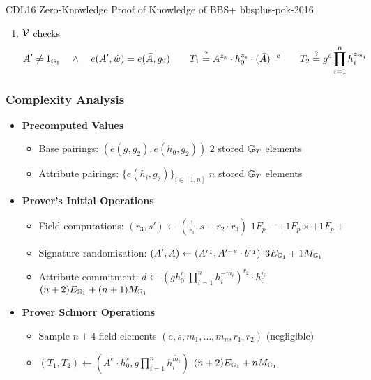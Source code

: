 {\begin{protocol}{CDL16 Zero-Knowledge Proof of Knowledge of BBS+  \cite{camenisch_anonymous_2016}}{bbsplus-pok-2016}
\begin{enumerate}
    \item $\mathcal{V}$ checks
        \[
            A' \neq 1_{\mathbb{G}_1} \quad \wedge \quad e(A',\hat{w}) = e(\Bar{A},g_2) \qquad T_1 \stackrel{?}{=} A^{z_e} \cdot h_0^{z_s} \cdot (\Bar{A})^{-c} \qquad T_2 \stackrel{?}{=} g^c\prod_{i=1}^n h_i^{z_{m_i}}
        \]
    \end{enumerate}
\end{protocol}

\newpage
\subsubsection{Complexity Analysis}

\begin{itemize}
    \item \textbf{Precomputed Values}
    \begin{itemize}
        \item Base pairings: $(e(g, g_2), e(h_0, g_2))$ \qquad $2$ stored $\mathbb{G}_T$ elements
        \item Attribute pairings: $\{e(h_i, g_2)\}_{i \in [1,n]}$ \qquad $n$ stored $\mathbb{G}_T$ elements
    \end{itemize}

    \item \textbf{Prover's Initial Operations}
    \begin{itemize}
        \item Field computations: $(r_3, s') \gets (\frac{1}{r_1}, s - r_2 \cdot r_3)$ \qquad $1F_p- + 1F_p\times + 1F_p+$
        \item Signature randomization: $(A', \Bar{A}) \gets (A^{r_1}, A'^{-e} \cdot b^{r_1})$ \qquad $3E_{\mathbb{G}_1} + 1M_{\mathbb{G}_1}$
        \item Attribute commitment: $d \gets (gh_0^{r_1}\prod_{i=1}^n h_i^{-m_i})^{r_2} \cdot h_0^{r_3}$ \qquad $(n+2)E_{\mathbb{G}_1} + (n+1)M_{\mathbb{G}_1}$
    \end{itemize}
    
    \item \textbf{Prover Schnorr Operations}
    \begin{itemize}
        \item Sample $n+4$ field elements $(\tilde{e}, \tilde{s}, \tilde{m_1},\ldots,\tilde{m_n}, \tilde{r_1}, \tilde{r_2})$ \qquad (negligible)
        \item $(T_1, T_2) \gets (A^{\tilde{e}} \cdot h_0^{\tilde{s}}, g\prod_{i=1}^n h_i^{\tilde{m_i}})$ \qquad $(n+2)E_{\mathbb{G}_1} + nM_{\mathbb{G}_1}$
    \end{itemize}
    

\end{itemize}}
